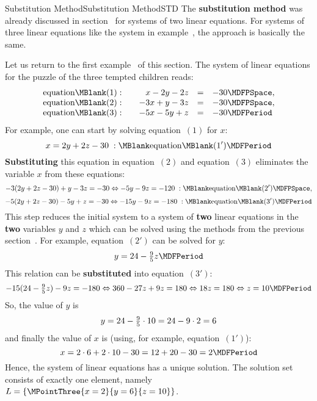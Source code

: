 \begin{MXContent}{Substitution Method}{Substitution Method}{STD}
The \textbf{substitution method} was already discussed in 
section~ for systems of two linear equations. 
For systems of three linear equations like the system in example~,
the approach is basically the same.

\begin{MExample}
Let us return to the first example~ of this section. The 
system of linear equations for the puzzle of the three tempted children reads:
$$\begin{array}{lcrcl} \mbox{equation}\MBlank (1): & & x - 2 y - 2 z & = & - 30 \MDFPSpace, \\
\mbox{equation}\MBlank (2): & & - 3 x + y - 3 z & = & - 30 \MDFPSpace, \\
\mbox{equation}\MBlank (3): & & - 5 x - 5 y + z & = & - 30 \MDFPeriod \end{array}$$
For example, one can start by solving equation~$(1)$ for $x$:
$$x = 2 y + 2 z - 30 \; : \MBlank\mbox{equation}\MBlank (1') \MDFPeriod$$
\textbf{Substituting} this equation in equation~$(2)$ and equation~$(3)$ eliminates
the variable $x$ from these equations:
$$- 3 (2 y + 2 z - 30) + y - 3 z = - 30 \Leftrightarrow - 5 y - 9 z = - 120 \; : \MBlank\mbox{equation}\MBlank (2') \MDFPSpace, $$
$$- 5 (2 y + 2 z - 30) - 5 y + z = - 30 \Leftrightarrow - 15 y - 9 z = - 180 \; : \MBlank\mbox{equation}\MBlank (3') \MDFPeriod $$
This step reduces the initial system to a system of \textbf{two} linear equations in the \textbf{two} variables
$y$ and $z$ which can be solved using the methods from the previous section~.
For example, equation~$(2')$ can be solved for $y$:
 $$y = 24 - \Mtfrac95 z \MDFPeriod$$
This relation can be \textbf{substituted} into equation~$(3')$:
$$- 15 (24 - \Mtfrac95 z) - 9 z = - 180 \Leftrightarrow 360 - 27 z + 9 z = 180 \Leftrightarrow 18 z = 180
\Leftrightarrow z = 10 \MDFPeriod$$
So, the value of $y$ is
$$y = 24 - \tfrac{9}{5} \cdot 10 = 24 - 9 \cdot 2 = 6 $$
and finally the value of $x$ is (using, for example, equation~$(1')$):
$$x = 2 \cdot 6 + 2 \cdot 10 - 30 = 12 + 20 - 30 = 2 \MDFPeriod$$
Hence, the system of linear equations has a unique solution. The solution set consists of exactly
one element, namely ${\ML} = \{ \MPointThree{x = 2}{y = 6}{z = 10} \}$.
\end{MExample}


\end{MXContent}

